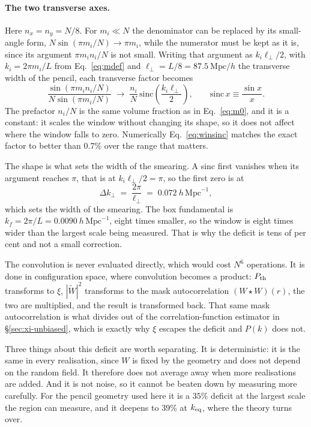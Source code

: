 \documentclass[12pt]{article}
\newcommand{\Mpch}{\ \mathrm{Mpc}/h}
\begin{document}
\paragraph{The two transverse axes.}
Here $n_x = n_y = N/8$. For $m_i \ll N$ the denominator can be replaced by its
small-angle form, $N\sin(\pi m_i/N) \to \pi m_i$, while the numerator must be
kept as it is, since its argument $\pi m_i n_i/N$ is not small. Writing that
argument as $k_i \ell_\perp/2$, with $k_i = 2\pi m_i/L$ from Eq.~\eqref{eq:mdef}
and $\ell_\perp = L/8 = 87.5\Mpch$ the transverse width of the pencil, each
transverse factor becomes
\begin{equation}
  \label{eq:winsinc}
  \frac{\sin(\pi m_i n_i/N)}{N\sin(\pi m_i/N)}
  \;\longrightarrow\;
  \frac{n_i}{N}\,\mathrm{sinc}\!\left(\frac{k_i \ell_\perp}{2}\right),
  \qquad \mathrm{sinc}\,x \equiv \frac{\sin x}{x} .
\end{equation}
The prefactor $n_i/N$ is the same volume fraction as in Eq.~\eqref{eq:m0}, and
it is a constant: it scales the window without changing its shape, so it does
not affect where the window falls to zero. Numerically Eq.~\eqref{eq:winsinc}
matches the exact factor to better than $0.7\%$ over the range that matters.

The shape is what sets the width of the smearing. A sinc first vanishes when its
argument reaches $\pi$, that is at $k_i \ell_\perp/2 = \pi$, so the first zero is
at
\begin{equation}
  \label{eq:dkperp}
  \Delta k_\perp \;=\; \frac{2\pi}{\ell_\perp} \;=\; 0.072\ h\,\mathrm{Mpc}^{-1},
\end{equation}
which sets the width of the smearing. The box fundamental is
$k_f = 2\pi/L = 0.0090\ h\,\mathrm{Mpc}^{-1}$, eight times smaller, so the window
is eight times wider than the largest scale being measured. That is why the
deficit is tens of per cent and not a small correction.

The convolution is never evaluated directly, which would cost $N^6$ operations.
It is done in configuration space, where convolution becomes a product:
$P_{\rm th}$ transforms to $\xi$, $|\widetilde W|^2$ transforms to the mask
autocorrelation $(W \star W)(r)$, the two are multiplied, and the result is
transformed back. That same mask autocorrelation is what divides out of the
correlation-function estimator in \S\ref{sec:xi-unbiased}, which is exactly why
$\xi$ escapes the deficit and $P(k)$ does not.

Three things about this deficit are worth separating. It is deterministic: it is
the same in every realisation, since $W$ is fixed by the geometry and does not
depend on the random field. It therefore does not average away when more
realisations are added. And it is not noise, so it cannot be beaten down by
measuring more carefully. For the pencil geometry used here it is a $35\%$
deficit at the largest scale the region can measure, and it deepens to $39\%$
at $k_{\rm eq}$, where the theory turns over.
\end{document}
